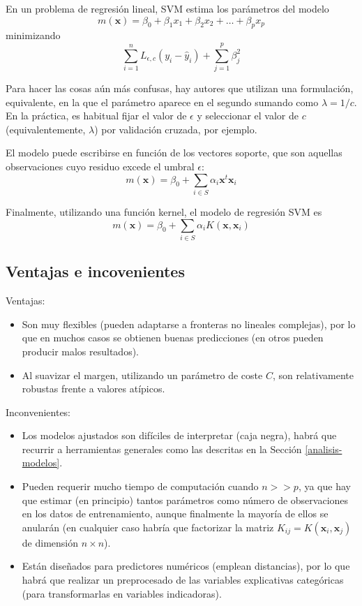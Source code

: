 \documentclass[
]{book}
\theoremstyle{break}
\theoremstyle{definition}
\theoremstyle{definition}
\theoremstyle{definition}
\theoremstyle{definition}
\theoremstyle{remark}
\begin{document}
En un problema de regresión lineal, SVM estima los parámetros del modelo
\[m(\mathbf{x}) = \beta_0 + \beta_1 x_1 + \beta_2 x_2 + \ldots + \beta_p x_p\]
minimizando
\[\sum_{i=1}^n L_{\epsilon,c} (y_i - \hat y_i) + \sum_{j=1}^p \beta_j^2\]

Para hacer las cosas aún más confusas, hay autores que utilizan una formulación, equivalente, en la que el parámetro aparece en el segundo sumando como \(\lambda = 1/c\). En la práctica, es habitual fijar el valor de \(\epsilon\) y seleccionar el valor de \(c\) (equivalentemente, \(\lambda\)) por validación cruzada, por ejemplo.

El modelo puede escribirse en función de los vectores soporte, que son aquellas observaciones cuyo residuo excede el umbral \(\epsilon\):
\[m(\mathbf{x}) = \beta_0 + \sum_{i\in S} \alpha_i \mathbf{x}^t \mathbf{x}_i\]

Finalmente, utilizando una función kernel, el modelo de regresión SVM es
\[m(\mathbf{x}) = \beta_0 + \sum_{i\in S} \alpha_i K(\mathbf{x}, \mathbf{x}_i)\]

\hypertarget{ventajas-e-incovenientes}{%
\subsection{Ventajas e incovenientes}\label{ventajas-e-incovenientes}}

Ventajas:

\begin{itemize}
\item
  Son muy flexibles (pueden adaptarse a fronteras no lineales complejas), por lo que en muchos casos se obtienen buenas predicciones (en otros pueden producir malos resultados).
\item
  Al suavizar el margen, utilizando un parámetro de coste \(C\), son relativamente robustas frente a valores atípicos.
\end{itemize}

Inconvenientes:

\begin{itemize}
\item
  Los modelos ajustados son difíciles de interpretar (caja negra), habrá que recurrir a herramientas generales como las descritas en la Sección \ref{analisis-modelos}.
\item
  Pueden requerir mucho tiempo de computación cuando \(n >> p\), ya que hay que estimar (en principio) tantos parámetros como número de observaciones en los datos de entrenamiento, aunque finalmente la mayoría de ellos se anularán (en cualquier caso habría que factorizar la matriz \(K_{ij} = K(\mathbf{x}_i, \mathbf{x}_j)\) de dimensión \(n \times n\)).
\item
  Están diseñados para predictores numéricos (emplean distancias), por lo que habrá que realizar un preprocesado de las variables explicativas categóricas (para transformarlas en variables indicadoras).
\end{itemize}
\end{document}
